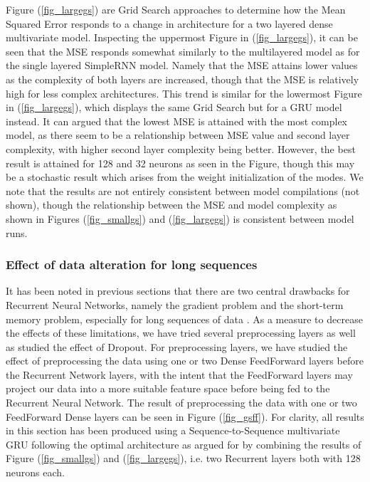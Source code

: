\documentclass
[twocolumn,
secnumarabic,
nobibnotes,
aps,
prl,
reprint,
groupedaddress,
amsmath,
amssymb,
]{revtex4-2}
\begin{document}
Figure (\ref{fig_largegs}) are Grid Search approaches to determine how the Mean Squared Error responds to a change in architecture for a two layered dense multivariate model. Inspecting the uppermost Figure in (\ref{fig_largegs}), it can be seen that the MSE responds somewhat similarly to the multilayered model as for the single layered SimpleRNN model. Namely that the MSE attains lower values as the complexity of both layers are increased, though that the MSE is relatively high for less complex architectures. This trend is similar for the lowermost Figure in (\ref{fig_largegs}), which displays the same Grid Search but for a GRU model instead. It can argued that the lowest MSE is attained with the most complex model, as there seem to be a relationship between MSE value and second layer complexity, with higher second layer complexity being better. However, the best result is attained for 128 and 32 neurons as seen in the Figure, though this may be a stochastic result which arises from the weight initialization of the modes. We note that the results are not entirely consistent between model compilations (not shown), though the relationship between the MSE and model complexity as shown in Figures (\ref{fig_smallgs}) and (\ref{fig_largegs}) is consistent between model runs. 

\subsubsection{Effect of data alteration for long sequences}
It has been noted in previous sections that there are two central drawbacks for Recurrent Neural Networks, namely the gradient problem and the short-term memory problem, especially for long sequences of data \cite{Geron2019}. As a measure to decrease the effects of these limitations, we have tried several preprocessing layers as well as studied the effect of Dropout. For preprocessing layers, we have studied the effect of preprocessing the data using one or two Dense FeedForward layers before the Recurrent Network layers, with the intent that the FeedForward layers may project our data into a more suitable feature space before being fed to the Recurrent Neural Network. The result of preprocessing the data with one or two FeedForward Dense layers can be seen in Figure (\ref{fig_gsff}). For clarity, all results in this section has been produced using a Sequence-to-Sequence multivariate GRU following the optimal architecture as argued for by combining the results of Figure (\ref{fig_smallgs}) and (\ref{fig_largegs}), i.e. two Recurrent layers both with 128 neurons each.
\end{document}
